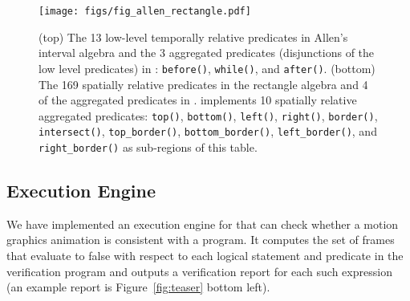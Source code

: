 
\begin{figure}[t]
  \centering
  \texttt{[image: figs/fig\_allen\_rectangle.pdf]}
  \vspace{-2em}
  \caption{
      (top) The 13 low-level temporally relative predicates in Allen's interval algebra and the 3 aggregated predicates (disjunctions of the low level predicates) in \dslname: \texttt{before()}, \texttt{while()}, and \texttt{after()}. 
      (bottom) The 169 spatially relative predicates in the rectangle algebra and 4 of the aggregated predicates in \dslname{}. 
      \dslname{} implements 10 spatially relative aggregated predicates: \texttt{top()}, \texttt{bottom()}, \texttt{left()}, \texttt{right()}, \texttt{border()}, \texttt{intersect()}, \texttt{top\_border()}, \texttt{bottom\_border()}, \texttt{left\_border()}, and \texttt{right\_border()} as sub-regions of this table.
  }
    \vspace{-2em}
  \label{fig:allen_rectangle}
\end{figure}




\subsection{\dslname{} Execution Engine}
\label{sec:execution}
%
%

We have implemented an execution engine for \dslname{} that can check
whether a motion graphics animation is consistent with a \dslname{}
program.
%
It computes the set of frames that evaluate to false with respect to
each logical statement and predicate in the verification program and
outputs a verification report for each such expression
(an example report is Figure~\ref{fig:teaser} bottom left).

